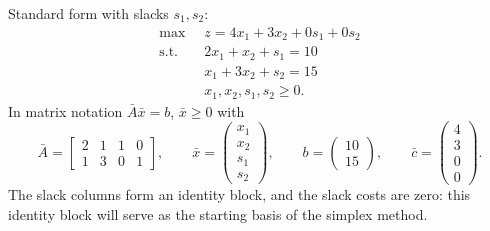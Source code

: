 \begin{solutions}
  \item Standard form with slacks $s_{1},s_{2}$:
        \[
          \begin{aligned}
            \max\;\; & z=4x_{1}+3x_{2}+0s_{1}+0s_{2}\\
            \text{s.t.}\;\; & 2x_{1}+x_{2}+s_{1}=10\\
            & x_{1}+3x_{2}+s_{2}=15\\
            & x_{1},x_{2},s_{1},s_{2}\ge 0 .
          \end{aligned}
        \]
        In matrix notation $\bar{A}\bar{x}=b$, $\bar{x}\ge 0$ with
        \[
          \bar{A}=\begin{bmatrix}
              2 & 1 & 1 & 0\\
              1 & 3 & 0 & 1
            \end{bmatrix},\qquad
          \bar{x}=\begin{pmatrix}x_{1}\\x_{2}\\s_{1}\\s_{2}\end{pmatrix},
          \qquad
          b=\begin{pmatrix}10\\15\end{pmatrix},\qquad
          \bar{c}=\begin{pmatrix}4\\3\\0\\0\end{pmatrix}.
        \]
        The slack columns form an identity block, and the slack costs are
        zero: this identity block will serve as the starting basis of
        the simplex method.


\end{solutions}
